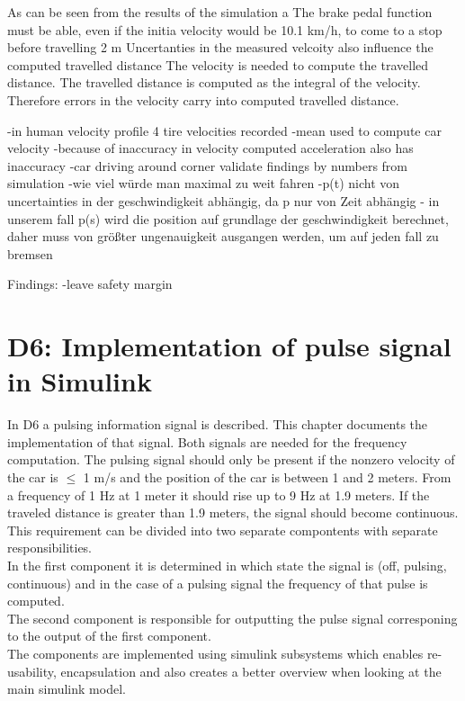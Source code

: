 As can be seen from the results of the simulation a 
The brake pedal function must be able, even if the initia velocity would be 10.1 km/h, to come to a stop before travelling 2 m
Uncertanties in the measured velcoity also influence the computed travelled distance
The velocity is needed to compute the travelled distance. The travelled distance is computed as the integral of the velocity. Therefore errors in the velocity carry into computed travelled distance.


-in human velocity profile 4 tire velocities recorded
-mean used to compute car velocity
-because of inaccuracy in velocity computed acceleration also has inaccuracy
-car driving around corner
validate findings by numbers from simulation
-wie viel würde man maximal zu weit fahren
-p(t) nicht von uncertainties in der geschwindigkeit abhängig, da p nur von Zeit abhängig 
- in unserem fall p(s) wird die position auf grundlage der geschwindigkeit berechnet, daher muss von größter ungenauigkeit ausgangen werden, um auf jeden fall zu bremsen

Findings:
-leave safety margin

\chapter{D6: Implementation of pulse signal in Simulink}\label{cha:D6}

In D6 a pulsing information signal is described. This chapter documents the implementation of that signal.
Both signals are needed for the frequency computation.
The pulsing signal should only be present if the nonzero velocity of the car is $\leq$ 1 m/s and the position of the car is between 1 and 2 meters. From a frequency of 1 Hz at 1 meter it should rise up to 9 Hz at 1.9 meters. If the traveled distance is greater than 1.9 meters, the signal should become continuous.\\
This requirement can be divided into two separate compontents with separate responsibilities.\\
In the first component it is determined in which state the signal is (off, pulsing, continuous) and in the case of a pulsing signal the frequency of that pulse is computed.\\
The second component is responsible for outputting the pulse signal corresponing to the output of the first component.\\
The components are implemented using simulink subsystems which enables re-usability, encapsulation and also creates a better overview when looking at the main simulink model.\\
